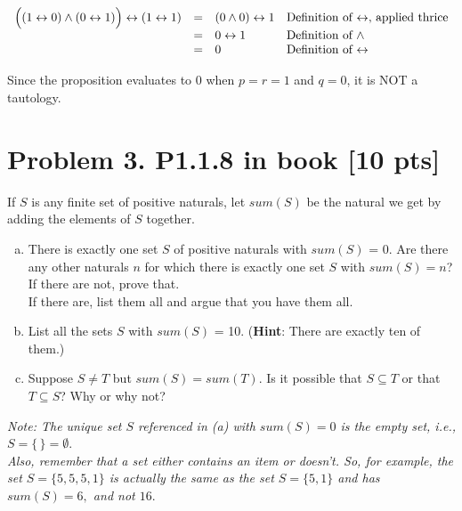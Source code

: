 \documentclass[12pt]{article}
\begin{document}
\begin{enumerate}[(a)]
			\[
				\begin{array}{rcll}
					\Bigl((1 \leftrightarrow 0)\wedge(0 \leftrightarrow 1)\Bigr) \leftrightarrow(1 \leftrightarrow 1) & = & (0 \wedge 0)\leftrightarrow 1 & \mbox{Definition of $\leftrightarrow$, applied thrice} \\
					                                                                                                  & = & 0 \leftrightarrow 1           & \mbox{Definition of $\wedge$}                          \\
					                                                                                                  & = & 0                             & \mbox{Definition of $\leftrightarrow$}
				\end{array}
			\]

			\noindent
			Since the proposition evaluates to $0$ when $p=r=1$ and $q=0$, it is NOT a
			tautology.
	\end{enumerate}

	\newpage
	\section*{\textbf{Problem 3. P1.1.8 in book} [10 pts]}

	If $S$ is any finite set of positive naturals, let $sum(S)$ be the natural we get
	by adding the elements of $S$ together.
	\begin{enumerate}[(a)]
		\item There is exactly one set $S$ of positive naturals with $sum(S)$ = 0. Are
			there any other naturals $n$ for which there is exactly one set $S$ with $s
			um(S)= n$? \\
			If there are not, prove that.\\
			If there are, list them all and argue that you have them all.

		\item List all the sets $S$ with $sum(S)$ = 10. (\textbf{Hint}: There are
			exactly ten of them.)

		\item Suppose $S \not= T$ but $sum(S)= sum(T)$. Is it possible that
			$S \subseteq T$ or that $T \subseteq S$? Why or why not?
	\end{enumerate}
	{\em \small Note: The unique set $S$ referenced in (a) with $sum(S)=0$ is the empty set, i.e., $S= \{\,\} = \emptyset.$\\ Also, remember that a set either contains an item or doesn't. So, for example, the set $S = \{5,5,5, 1\}$ is actually the same as the set $S = \{5,1\}$ and has $sum(S) =6,$ and not $16.$ }
\end{document}
